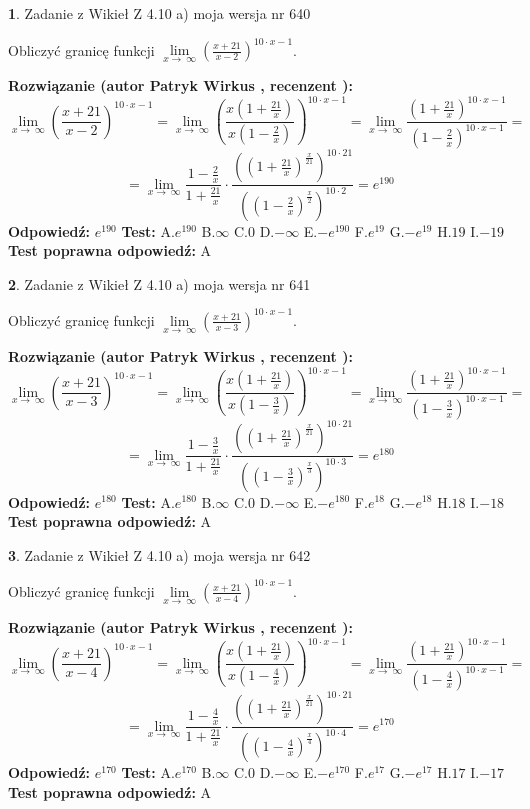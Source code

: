 \documentclass[12pt, a4paper]{article}
\theoremstyle{definition} %
\newtheorem{zad}{}
\newcommand{\zadStart}[1]{\begin{zad}#1\newline}
\newcommand{\zadStop}{\end{zad}}
\newcommand{\rozwStart}[2]{\noindent \textbf{Rozwiązanie (autor #1 , recenzent #2): }\newline}
\newcommand{\rozwStop}{\newline}
\newcommand{\odpStart}{\noindent \textbf{Odpowiedź:}\newline}
\newcommand{\odpStop}{\newline}
\newcommand{\testStart}{\noindent \textbf{Test:}\newline}
\newcommand{\testStop}{\newline}
\newcommand{\kluczStart}{\noindent \textbf{Test poprawna odpowiedź:}\newline}
\newcommand{\kluczStop}{\newline}
\begin{document}
\zadStart{Zadanie z Wikieł Z 4.10 a) moja wersja nr 640}

Obliczyć granicę funkcji  $\lim\limits_{x\to\ \infty}(\frac{x+21}{x-2})^{10\cdot x-1}$.
\zadStop
\rozwStart{Patryk Wirkus}{}
$$\lim\limits_{x\to\ \infty}(\frac{x+21}{x-2})^{10\cdot x-1} = \lim\limits_{x\to\ \infty}(\frac{x(1+\frac{21}{x})}{x(1-\frac{2}{x})})^{10\cdot x-1}=\lim\limits_{x\to\ \infty}\frac{(1+\frac{21}{x})^{10\cdot x-1}}{(1-\frac{2}{x})^{10\cdot x-1}}=$$
$$=\lim\limits_{x\to\ \infty}\frac{1-\frac{2}{x}}{1+\frac{21}{x}}\cdot\frac{((1+\frac{21}{x})^{\frac{x}{21}})^{10\cdot21}}{((1-\frac{2}{x})^{\frac{x}{2}})^{10\cdot2}}=e^{190}$$
\rozwStop
\odpStart
$e^{190}$
\odpStop
\testStart
A.$e^{190}$ B.$\infty$ C.$0$ D.$-\infty$ E.$-e^{190}$
F.$e^{19}$ G.$-e^{19}$
H.$19$
I.$-19$
\testStop
\kluczStart
A
\kluczStop



\zadStart{Zadanie z Wikieł Z 4.10 a) moja wersja nr 641}

Obliczyć granicę funkcji  $\lim\limits_{x\to\ \infty}(\frac{x+21}{x-3})^{10\cdot x-1}$.
\zadStop
\rozwStart{Patryk Wirkus}{}
$$\lim\limits_{x\to\ \infty}(\frac{x+21}{x-3})^{10\cdot x-1} = \lim\limits_{x\to\ \infty}(\frac{x(1+\frac{21}{x})}{x(1-\frac{3}{x})})^{10\cdot x-1}=\lim\limits_{x\to\ \infty}\frac{(1+\frac{21}{x})^{10\cdot x-1}}{(1-\frac{3}{x})^{10\cdot x-1}}=$$
$$=\lim\limits_{x\to\ \infty}\frac{1-\frac{3}{x}}{1+\frac{21}{x}}\cdot\frac{((1+\frac{21}{x})^{\frac{x}{21}})^{10\cdot21}}{((1-\frac{3}{x})^{\frac{x}{3}})^{10\cdot3}}=e^{180}$$
\rozwStop
\odpStart
$e^{180}$
\odpStop
\testStart
A.$e^{180}$ B.$\infty$ C.$0$ D.$-\infty$ E.$-e^{180}$
F.$e^{18}$ G.$-e^{18}$
H.$18$
I.$-18$
\testStop
\kluczStart
A
\kluczStop



\zadStart{Zadanie z Wikieł Z 4.10 a) moja wersja nr 642}

Obliczyć granicę funkcji  $\lim\limits_{x\to\ \infty}(\frac{x+21}{x-4})^{10\cdot x-1}$.
\zadStop
\rozwStart{Patryk Wirkus}{}
$$\lim\limits_{x\to\ \infty}(\frac{x+21}{x-4})^{10\cdot x-1} = \lim\limits_{x\to\ \infty}(\frac{x(1+\frac{21}{x})}{x(1-\frac{4}{x})})^{10\cdot x-1}=\lim\limits_{x\to\ \infty}\frac{(1+\frac{21}{x})^{10\cdot x-1}}{(1-\frac{4}{x})^{10\cdot x-1}}=$$
$$=\lim\limits_{x\to\ \infty}\frac{1-\frac{4}{x}}{1+\frac{21}{x}}\cdot\frac{((1+\frac{21}{x})^{\frac{x}{21}})^{10\cdot21}}{((1-\frac{4}{x})^{\frac{x}{4}})^{10\cdot4}}=e^{170}$$
\rozwStop
\odpStart
$e^{170}$
\odpStop
\testStart
A.$e^{170}$ B.$\infty$ C.$0$ D.$-\infty$ E.$-e^{170}$
F.$e^{17}$ G.$-e^{17}$
H.$17$
I.$-17$
\testStop
\kluczStart
A
\kluczStop
\end{document}
